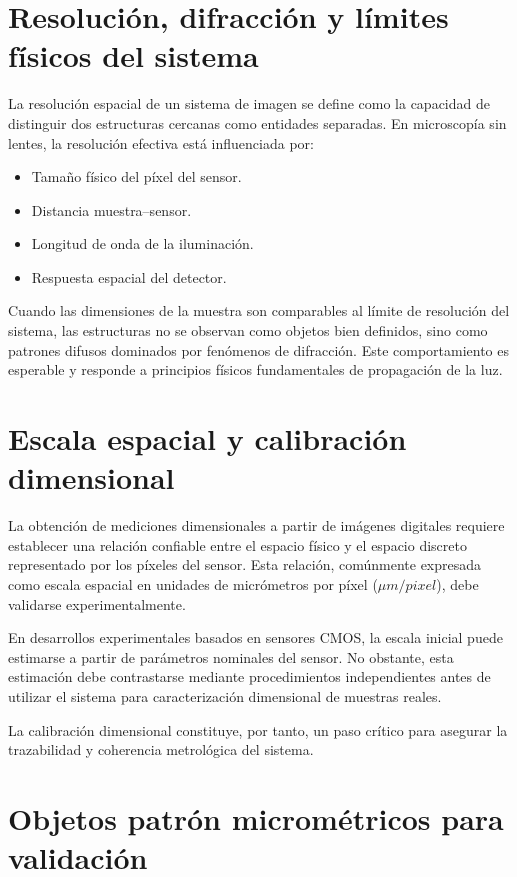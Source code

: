 \section{Resolución, difracción y límites físicos del sistema}

La resolución espacial de un sistema de imagen se define como la capacidad de distinguir dos estructuras cercanas como entidades separadas. En microscopía sin lentes, la resolución efectiva está influenciada por:

\begin{itemize}
    \item Tamaño físico del píxel del sensor.
    \item Distancia muestra–sensor.
    \item Longitud de onda de la iluminación.
    \item Respuesta espacial del detector.
\end{itemize}

Cuando las dimensiones de la muestra son comparables al límite de resolución del sistema, las estructuras no se observan como objetos bien definidos, sino como patrones difusos dominados por fenómenos de difracción. Este comportamiento es esperable y responde a principios físicos fundamentales de propagación de la luz.

\section{Escala espacial y calibración dimensional}

La obtención de mediciones dimensionales a partir de imágenes digitales requiere establecer una relación confiable entre el espacio físico y el espacio discreto representado por los píxeles del sensor. Esta relación, comúnmente expresada como escala espacial en unidades de micrómetros por píxel ($\mu m/pixel$), debe validarse experimentalmente.

En desarrollos experimentales basados en sensores CMOS, la escala inicial puede estimarse a partir de parámetros nominales del sensor. No obstante, esta estimación debe contrastarse mediante procedimientos independientes antes de utilizar el sistema para caracterización dimensional de muestras reales.

La calibración dimensional constituye, por tanto, un paso crítico para asegurar la trazabilidad y coherencia metrológica del sistema.

\section{Objetos patrón micrométricos para validación}

